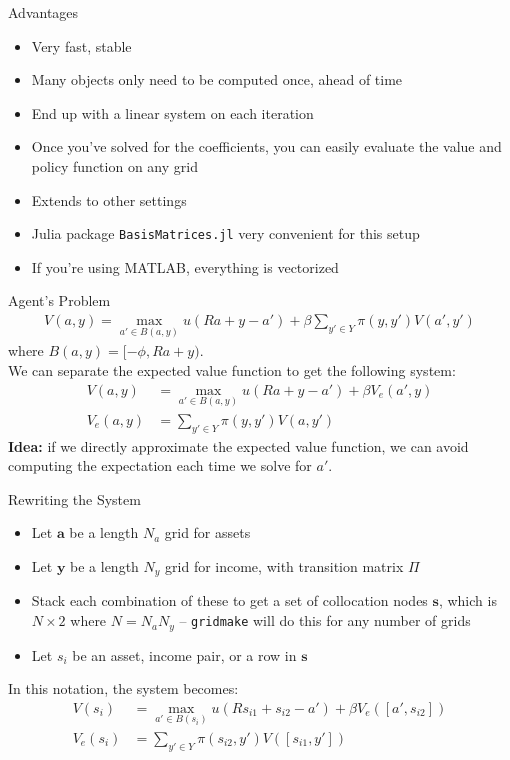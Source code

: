\documentclass{beamer}
\begin{document}
\begin{frame}{Advantages}
\begin{itemize}
\item Very fast, stable
\item Many objects only need to be computed once, ahead of time
\item End up with a linear system on each iteration
\item Once you've solved for the coefficients, you can easily evaluate the value and policy function on any grid
\item Extends to other settings
\item Julia package \texttt{BasisMatrices.jl} very convenient for this setup
\item If you're using MATLAB, everything is vectorized
\end{itemize}
\end{frame}

\begin{frame}{Agent's Problem}
\begin{align*}
    V(a, y) = \max_{a' \in B(a, y)} u(Ra + y - a') + \beta \displaystyle \sum_{y' \in Y} \pi(y, y') V(a', y') 
\end{align*}
where $B(a, y) = [-\phi, Ra + y)$. \\ \vspace{1mm}
We can separate the expected value function to get the following system:
\begin{align*}
    V(a, y) &= \max_{a' \in B(a, y)} u(Ra + y - a') + \beta V_e(a', y) \\
    V_e(a, y) &= \displaystyle \sum_{y' \in Y} \pi(y, y') V(a, y')
\end{align*}
\textbf{Idea:} if we directly approximate the expected value function, we can avoid computing the expectation each time we solve for $a'$.
\end{frame}

\begin{frame}{Rewriting the System}
\begin{itemize}
\item Let $\mathbf{a}$ be a length $N_a$ grid for assets
\item Let $\mathbf{y}$ be a length $N_y$ grid for income, with transition matrix $\Pi$
\item Stack each combination of these to get a set of collocation nodes $\mathbf{s}$, which is $N \times 2$ where $N = N_a N_y$ -- \texttt{gridmake} will do this for any number of grids
\item Let $s_i$ be an asset, income pair, or a row in $\mathbf{s}$  
\end{itemize}
In this notation, the system becomes: 
\begin{align*}
    V(s_i) &= \max_{a' \in B(s_i)} u(Rs_{i1} + s_{i2} - a') + \beta V_e([a', s_{i2}]) \\
    V_e(s_i) &= \displaystyle \sum_{y' \in Y} \pi(s_{i2}, y') V([s_{i1}, y'])
\end{align*}
\end{frame}
\end{document}
